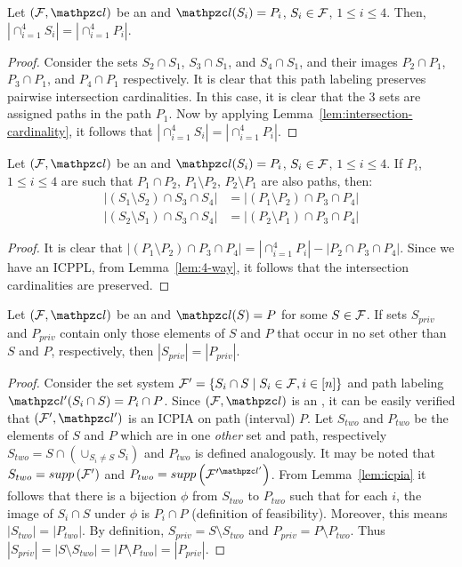 \begin{lemma}
  \label{lem:4-way}
  Let $(\cF, \cl)$ be an \ICPPL and $\cl(S_i)=P_i$, $S_i \in {\cal F}$, $1
  \leq i \leq 4$.  Then, $|\cap_{i=1}^4 S_i| = |\cap_{i=1}^4 P_i|$.
\end{lemma}
\begin{proof}
  Consider the sets $S_2 \cap S_1$, $S_3 \cap S_1$, and $S_4 \cap
  S_1$, and their images $P_2 \cap P_1$, $P_3 \cap P_1$, and $P_4 \cap
  P_1$ respectively.  It is clear that this path labeling preserves
  pairwise intersection cardinalities.  In this case, it is clear that
  the 3 sets are assigned paths in the path $P_1$.  Now by applying
  Lemma~\ref{lem:intersection-cardinality}, it follows that
  $|\cap_{i=1}^4 S_i| =| \cap_{i=1}^4 P_i|$.
\end{proof}
\begin{corollary} 
  \label{corr:4-way} 
  Let $(\cF, \cl)$ be an \ICPPL and $\cl(S_i)=P_i$, $S_i \in {\cal F}$, $1
  \leq i \leq 4$. If $P_i$, $1
  \leq i \leq 4$ are such that $P_1 \cap P_2$, $P_1
  \setminus P_2$, $P_2 \setminus P_1$ are also paths, then:
  \begin{align*}
   |(S_1 \setminus S_2) \cap S_3 \cap S_4| &= |(P_1 \setminus P_2) \cap P_3 \cap P_4|\\
   |(S_2 \setminus S_1) \cap S_3 \cap S_4| &= |(P_2 \setminus P_1) \cap P_3 \cap P_4| 
  \end{align*}
\end{corollary}
\begin{proof}
  It is clear that $|(P_1 \setminus P_2) \cap P_3 \cap P_4| =
  |\displaystyle \cap_{i=1}^4 P_i| - | P_2 \cap P_3 \cap P_4|$.  Since
  we have an ICPPL, from Lemma~\ref{lem:4-way}, it follows that the
  intersection cardinalities are preserved.
\end{proof}
\begin{lemma}
  \label{lem:priv-card}
  Let $(\cF, \cl)$ be an \ICPPL and $\cl(S) = P$ for some $S \in {\cal F}$.  If sets
  $S_{priv}$ and $P_{priv}$ contain only those elements of $S$ and $P$
  that occur in no set other than $S$ and $P$, respectively, then
  $|S_{priv}|=|P_{priv}|$.
\end{lemma}
\begin{proof}
  Consider the set system $ {\cal F}' = \{S_i \cap S \mid S_i \in {\cal F}, i
  \in [n]\}$ and path labeling $\cl'(S_i \cap S) = P_i \cap P$.  Since
  $(\cF, \cl)$ is an \ICPPL, it can be easily verified that $(\cF',
  \cl')$ is an ICPIA on path (interval) $P$.  Let $S_{two}$ and
  $P_{two}$ be the elements of $S$ and $P$ which are in one {\em
    other} set and path, respectively \ie $S_{two} = S \cap (\cup_{S_i
    \ne S} S_i)$ and $P_{two}$ is defined analogously. It may be noted
  that $S_{two} = supp\left({\cal F}'\right)$ and $P_{two} = \supt{\cF'^{\cl'}}$.
  From Lemma~\ref{lem:icpia} it follows that there is a bijection
  $\phi$ from $S_{two}$ to $P_{two}$ such that for each $i$, the image
  of $S_i \cap S$ under $\phi$ is $P_i \cap P$ (definition of
  feasibility).  Moreover, this means $|S_{two}| = |P_{two}|$. By
  definition, $S_{priv} = S \setminus S_{two}$ and $P_{priv} = P \setminus P_{two}$.
  Thus $|S_{priv}| = |S \setminus S_{two}| = |P \setminus
  P_{two}|=|P_{priv}|$.  
\end{proof}


